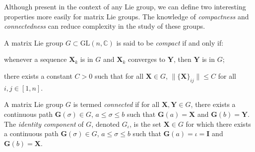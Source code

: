 Although present in the context of any Lie group, we can define two interesting properties more easily for matrix Lie groups. The knowledge of \emph{compactness} and \emph{connectedness} can reduce complexity in the study of these groups.
\begin{definition}
    A matrix Lie group $G\subset\text{GL}(n,\mathbb{C})$ is said to be \emph{compact} if and only if:
    \begin{property}
        \item whenever a sequence $\mathbf{X}_k$ is in $G$ and $\mathbf{X}_k$ converges to $\mathbf{Y}$, then $\mathbf{Y}$ is in $G$;
        \item there exists a constant $C>0$ such that for all $\mathbf{X}\in G$, $\|\{\mathbf{X}\}_{ij}\|\leq C$ for all $i,j\in[1,n]$.
    \end{property}
\end{definition}
\begin{definition}
    A matrix Lie group $G$ is termed \emph{connected} if for all $\mathbf{X},\mathbf{Y}\in G$, there exists a continuous path $\mathbf{G}(\sigma)\in G$, $a\le\sigma\le b$ such that $\mathbf{G}(a) = \mathbf{X}$ and $\mathbf{G}(b) = \mathbf{Y}$. The \emph{identity component} of $G$, denoted $G_\iota$, is the set $\mathbf{X}\in G$ for which there exists a continuous path $\mathbf{G}(\sigma)\in G$, $a\le\sigma\le b$ such that $\mathbf{G}(a) = \iota=\mathbf{I}$ and $\mathbf{G}(b) = \mathbf{X}$.
\end{definition}

